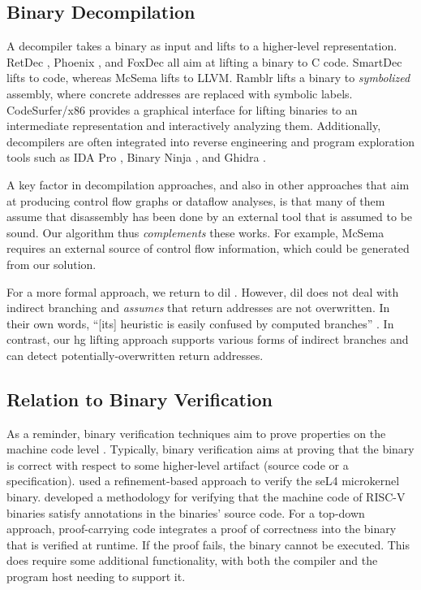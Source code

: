 \subsection{Binary Decompilation}\label{related-decompilation}
A decompiler takes a binary as input and lifts to a higher-level representation.
RetDec \autocite{retdec}, Phoenix \autocite{brumley2013native}, and FoxDec \autocite{verbeek2020sound} all aim at lifting a binary to C code.
SmartDec \autocite{fokin2011smartdec} lifts to \Cpp{} code, whereas McSema \autocite{dinaburg2014mcsema} lifts to LLVM.
Ramblr \autocite{wang2017ramblr} lifts a binary to \emph{symbolized} assembly, where concrete addresses are replaced with symbolic labels.
CodeSurfer/\gls{x86} \autocite{balakrishnan2004analyzing,balakrishnan2005codesurfer}
provides a graphical interface for lifting binaries to an intermediate representation and interactively analyzing them.
Additionally, decompilers are often integrated into reverse engineering and program exploration tools such as IDA Pro \autocite{ida-decompiler},
Binary Ninja \autocite{binary-ninja-decompiler}, and Ghidra \autocite{ghidra}.

A key factor in decompilation approaches, and also in other approaches that aim at producing control flow graphs or dataflow analyses, is that many of them assume that disassembly has been done by an external tool that is assumed to be sound.
Our algorithm thus \emph{complements} these works.
For example, McSema requires an external source of control flow information, which could be generated from our solution.

For a more formal approach, we return to \ac{dil} \autocite{myreen2007hoare,myreen2012decompilation}.
However, \ac{dil} does not deal with indirect branching and \emph{assumes} that return addresses are not overwritten.
In their own words, ``[its] heuristic is easily confused by computed branches'' \autocite{myreen2008decompilation}.
In contrast, our \ac{hg} lifting approach supports various forms of indirect branches and can detect potentially-overwritten return addresses.

\subsection{Relation to Binary Verification}\label{related-hg-verification}
As a reminder, binary verification techniques aim to prove properties on the machine code level \autocite{kumar2018software}.
Typically, binary verification aims at proving that the binary is correct with respect to some higher-level artifact (source code or a specification).
\Textcite{klein2009sel4,klein2010refinement,sewell2013tvv} used a refinement-based approach to verify the seL4 microkernel binary.
\Textcite{kamkin2020deductive} developed a methodology for verifying that the machine code of RISC-V binaries satisfy annotations in the binaries' source code.
For a top-down approach, proof-carrying code \autocite{necula1997proof}
integrates a proof of correctness into the binary that is verified at runtime.
If the proof fails, the binary cannot be executed.
This does require some additional functionality, with both the compiler and the program host needing to support it.

